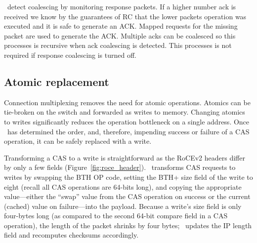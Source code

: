 \sword\ detect coalescing by monitoring response
packets. If a higher number ack is received we know by the
guarantees of RC that the lower packets operation was
executed and it is safe to generate an ACK. Mapped requests
for the missing packet are used to generate the ACK.
%
Multiple acks can be coalesced so
this processes is recursive when ack coalescing is detected.
This processes is not required if response coalescing is
turned off.


\subsection{Atomic replacement}

Connection multiplexing removes the need for atomic
operations. Atomics can be tie-broken on the switch and
forwarded as writes to memory. Changing atomics to writes
significantly reduces the operation bottleneck on a single
address. 
Once \sword\ has determined the order, and, therefore, impending
success or failure of a CAS operation, it can be safely replaced with a write.

Transforming a CAS to a write is straightforward as the RoCEv2 headers
differ by only a few fields (Figure~\ref{fig:roce_header}).
\sword\ transforms CAS requests to writes by swapping the BTH OP code,
setting the BTH+ size field of the write to eight (recall all CAS
operations are 64-bits long), and copying the appropriate
value---either the ``swap'' value from the CAS operation on success or
the current (cached) value on failure---into the payload.  Because a
write's size field is only four-bytes long (as compared to the second
64-bit compare field in a CAS operation), the length of the packet
shrinks by four bytes; \sword\ updates the IP length field and
recomputes checksums accordingly.


